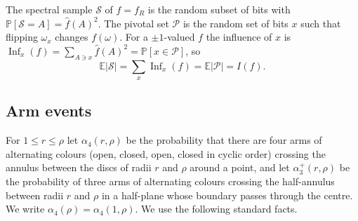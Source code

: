 \documentclass[11pt]{amsart}
\theoremstyle{remark}
\newcommand{\Inf}{\operatorname{Inf}}
\newcommand{\PP}{\mathbb{P}}
\newcommand{\EE}{\mathbb{E}}
\newcommand{\Sc}{\mathcal{S}}
\newcommand{\Pc}{\mathcal{P}}
\begin{document}
The spectral sample $\Sc$ of $f=f_R$ is the random subset of bits with $\PP[\Sc=A]=\hat f(A)^2$. The pivotal set $\Pc$ is the random set of bits $x$ such that flipping $\omega_x$ changes $f(\omega)$. For a $\pm1$-valued $f$ the influence of $x$ is $\Inf_x(f)=\sum_{A\ni x}\hat f(A)^2=\PP[x\in\Pc]$, so
\begin{equation}\label{eq:firstmoment}
\EE|\Sc|=\sum_x\Inf_x(f)=\EE|\Pc|=I(f).
\end{equation}

\subsection{Arm events}
For $1\le r\le \rho$ let $\alpha_4(r,\rho)$ be the probability that there are four arms of alternating colours (open, closed, open, closed in cyclic order) crossing the annulus between the discs of radii $r$ and $\rho$ around a point, and let $\alpha_3^+(r,\rho)$ be the probability of three arms of alternating colours crossing the half-annulus between radii $r$ and $\rho$ in a half-plane whose boundary passes through the centre. We write $\alpha_4(\rho)=\alpha_4(1,\rho)$. We use the following standard facts.
\end{document}
